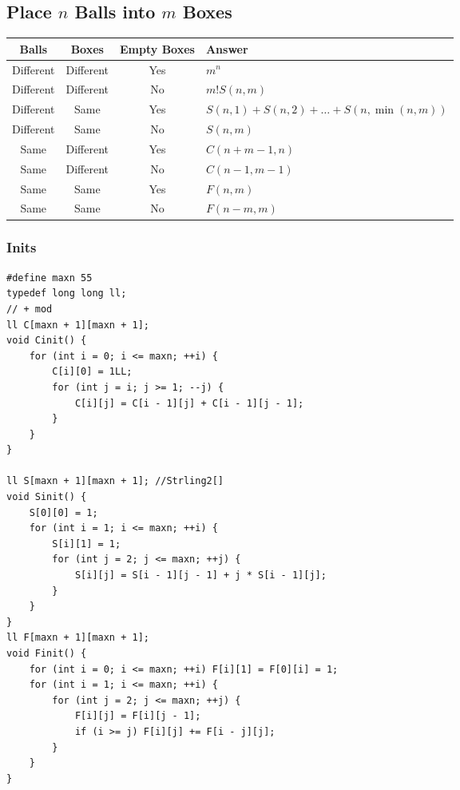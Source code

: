 \documentclass[a4paper]{article}
\begin{document}
\begin{CJK*}{UTF8}{gbsn}
\begin{multicols}{3}
\begin{flushleft}
\subsection{Place $n$ Balls into $m$ Boxes}
\begin{table}[h]
\scriptsize
    \begin{tabular}{|c|c|c|l|}
        \hline
        Balls & Boxes & Empty Boxes & Answer \\ \hline
        Different & Different & Yes & $m^n$ \\ \hline
        Different & Different & No & $m!S\left( {n,m} \right)$ \\ \hline
        Different & Same & Yes & $S\left( {n,1} \right) + S\left( {n,2} \right) +  \ldots  + S\left( {n,\min \left( {n,m} \right)} \right)$ \\ \hline
        Different & Same & No & $S\left( {n,m} \right)$ \\ \hline
        Same & Different & Yes & $C\left( {n + m - 1,n} \right)$ \\ \hline
        Same & Different & No & $C\left( {n - 1,m - 1} \right)$ \\ \hline
        Same & Same & Yes & $F\left( {n,m} \right)$ \\ \hline
        Same & Same & No & $F\left( {n - m,m} \right)$ \\
        \hline
    \end{tabular}
\end{table}



\subsubsection{Inits}
\begin{lstlisting}
#define maxn 55
typedef long long ll;
// + mod
ll C[maxn + 1][maxn + 1];
void Cinit() {
    for (int i = 0; i <= maxn; ++i) {
        C[i][0] = 1LL;
        for (int j = i; j >= 1; --j) {
            C[i][j] = C[i - 1][j] + C[i - 1][j - 1];
        }
    }
}

ll S[maxn + 1][maxn + 1]; //Strling2[]
void Sinit() {
    S[0][0] = 1;
    for (int i = 1; i <= maxn; ++i) {
        S[i][1] = 1;
        for (int j = 2; j <= maxn; ++j) {
            S[i][j] = S[i - 1][j - 1] + j * S[i - 1][j];
        }
    }
}
ll F[maxn + 1][maxn + 1];
void Finit() {
    for (int i = 0; i <= maxn; ++i) F[i][1] = F[0][i] = 1;
    for (int i = 1; i <= maxn; ++i) {
        for (int j = 2; j <= maxn; ++j) {
            F[i][j] = F[i][j - 1];
            if (i >= j) F[i][j] += F[i - j][j];
        }
    }
}


\end{lstlisting}
\end{flushleft}
\end{multicols}
\end{CJK*}
\end{document}

